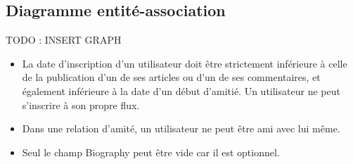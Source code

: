 \documentclass[11pt]{article}
\begin{document}
\subsection{Diagramme entité-association}
TODO : INSERT GRAPH
\begin{itemize}
\item{La date d'inscription d'un utilisateur doit être strictement inférieure à celle de la publication d'un de ses articles ou d'un de ses commentaires, et également inférieure à la date d'un début d'amitié.
Un utilisateur ne peut s'inscrire à son propre flux.}
\item{Dans une relation d'amité, un utilisateur ne peut être ami avec lui même.}
\item{Seul le champ Biography peut être vide car il est optionnel.}
\end{itemize}
\end{document}
